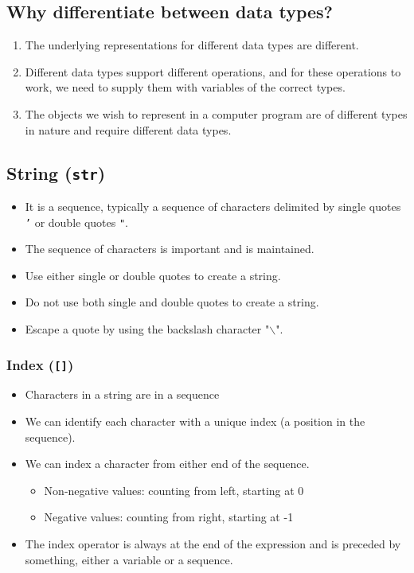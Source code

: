 \documentclass[11pt]{article}
\begin{document}
\subsection{Why differentiate between data types?}
\label{sec:orga9e6fa1}
\begin{enumerate}
\item The underlying representations for different data types are different.
\item Different data types support different operations, and for these operations to work, we need to supply them with variables of the correct types.
\item The objects we wish to represent in a computer program are of different types in nature and require different data types.
\end{enumerate}
\subsection{String (\texttt{str})}
\label{sec:orgee23d32}
\begin{itemize}
\item It is a sequence, typically a sequence of characters delimited by single quotes \texttt{'} or double quotes \texttt{"}.
\item The sequence of characters is important and is maintained.
\item Use either single or double quotes to create a string.
\item Do not use both single and double quotes to create a string.
\item Escape a quote by using the backslash character "$\backslash$".
\end{itemize}

 \newpage
\subsubsection{Index (\texttt{[]})}
\label{sec:orgd3d3a5c}
\begin{itemize}
\item Characters in a string are in a sequence
\item We can identify each character with a unique index (a position in the sequence).
\item We can index a character from either end of the sequence.
\begin{itemize}
\item Non-negative values: counting from left, starting at 0
\item Negative values: counting from right, starting at -1
\end{itemize}
\item The index operator is always at the end of the expression and is preceded by something, either a variable or a sequence.
\end{itemize}
\end{document}
